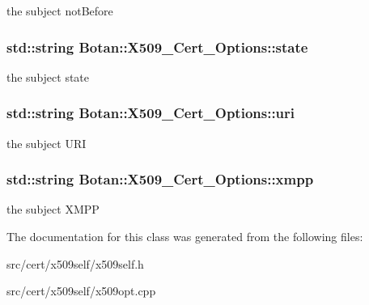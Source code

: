 the subject not\-Before \hypertarget{classBotan_1_1X509__Cert__Options_a58e9e7fa566c43c4dcd0e437e5ec6ab8}{
\subsubsection[{state}]{\setlength{\rightskip}{0pt plus 5cm}std\-::string Botan\-::\-X509\-\_\-\-Cert\-\_\-\-Options\-::state}}\label{classBotan_1_1X509__Cert__Options_a58e9e7fa566c43c4dcd0e437e5ec6ab8}
the subject state \hypertarget{classBotan_1_1X509__Cert__Options_a1346083cee0959d8616cc28587c76fae}{
\subsubsection[{uri}]{\setlength{\rightskip}{0pt plus 5cm}std\-::string Botan\-::\-X509\-\_\-\-Cert\-\_\-\-Options\-::uri}}\label{classBotan_1_1X509__Cert__Options_a1346083cee0959d8616cc28587c76fae}
the subject U\-R\-I \hypertarget{classBotan_1_1X509__Cert__Options_a97fb3e69f481cd232d02f973fd542f83}{
\subsubsection[{xmpp}]{\setlength{\rightskip}{0pt plus 5cm}std\-::string Botan\-::\-X509\-\_\-\-Cert\-\_\-\-Options\-::xmpp}}\label{classBotan_1_1X509__Cert__Options_a97fb3e69f481cd232d02f973fd542f83}
the subject X\-M\-P\-P 

The documentation for this class was generated from the following files\-:\begin{DoxyCompactItemize}
\item 
src/cert/x509self/x509self.\-h\item 
src/cert/x509self/x509opt.\-cpp\end{DoxyCompactItemize}
